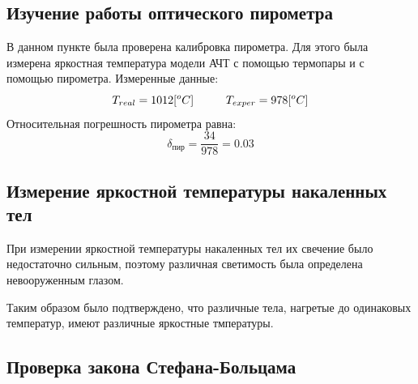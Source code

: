 \documentclass[a4paper,12pt]{article} %
\begin{document}
		\subsection{Изучение работы оптического пирометра}
		
			В данном пункте была проверена калибровка пирометра. 
			Для этого была измерена яркостная температура модели АЧТ с помощью термопары и с помощью пирометра.
			Измеренные данные:
			\begin{equation}
				T_{real} = 1012 [^oC] \hspace{10mm}
				T_{exper} = 978 [^oC] 
			\end{equation}
			Относительная погрешность пирометра равна:
			\begin{equation}
				\delta_{\text{пир}} = \frac{34}{978} = 0.03
			\end{equation}
			
		\subsection{Измерение яркостной температуры накаленных тел}

			При измерении яркостной температуры накаленных тел их свечение было недостаточно сильным, поэтому различная светимость была определена невооруженным глазом.\par
			Таким образом было подтверждено, что различные тела, нагретые до одинаковых температур, имеют различные яркостные тмпературы.
		
		\subsection{Проверка закона Стефана-Больцама}
\end{document}
